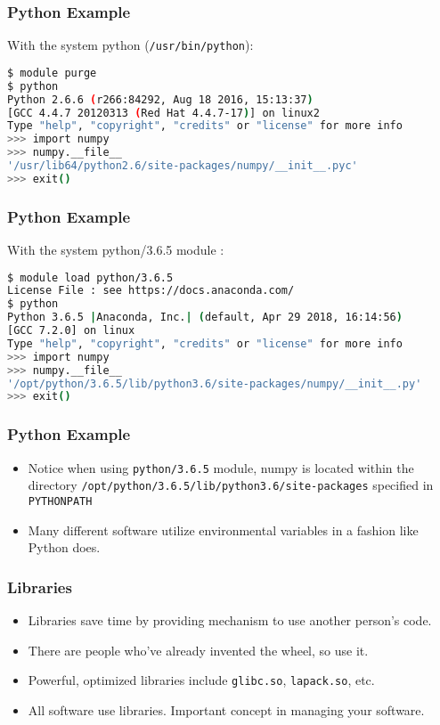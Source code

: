 \documentclass{beamer}
\newcommand{\code}[1]{\colorbox{codegray}{\texttt{#1}}}
\begin{document}
\begin{frame}[fragile]
\frametitle{Python Example}
With the system python (\code{/usr/bin/python}):
\begingroup
\scriptsize
\begin{lstlisting}[backgroundcolor = \color{codegray}, language = Bash, showstringspaces=false]
$ module purge
$ python
Python 2.6.6 (r266:84292, Aug 18 2016, 15:13:37)
[GCC 4.4.7 20120313 (Red Hat 4.4.7-17)] on linux2
Type "help", "copyright", "credits" or "license" for more info
>>> import numpy
>>> numpy.__file__
'/usr/lib64/python2.6/site-packages/numpy/__init__.pyc'
>>> exit()
\end{lstlisting}
\endgroup
\end{frame}


\begin{frame}[fragile]
\frametitle{Python Example}
With the system python/3.6.5 module :
\begingroup
\scriptsize
\begin{lstlisting}[backgroundcolor = \color{codegray}, language = Bash, showstringspaces=false]
$ module load python/3.6.5
License File : see https://docs.anaconda.com/
$ python
Python 3.6.5 |Anaconda, Inc.| (default, Apr 29 2018, 16:14:56)
[GCC 7.2.0] on linux
Type "help", "copyright", "credits" or "license" for more info
>>> import numpy
>>> numpy.__file__
'/opt/python/3.6.5/lib/python3.6/site-packages/numpy/__init__.py'
>>> exit()
\end{lstlisting}
\endgroup
\end{frame}


\begin{frame}
\frametitle{Python Example}
\begin{itemize}
    \item Notice when using \code{python/3.6.5} module, numpy is located within the directory \code{/opt/python/3.6.5/lib/python3.6/site-packages} specified in \code{PYTHONPATH} 
    \bigskip
    \pause
    \item Many different software utilize environmental variables in a fashion like Python does.
\end{itemize}
\end{frame}


\begin{frame}
\frametitle{Libraries}
\begin{itemize}
    \item Libraries save time by providing mechanism to use another person's code.
    \bigskip
    \pause
    \item There are people who've already invented the wheel, so use it.
    \bigskip
    \pause
    \item Powerful, optimized libraries include \code{glibc.so}, \code{lapack.so}, etc.
    \bigskip
    \pause
    \item All software use libraries. Important concept in managing your software.
\end{itemize}
\end{frame}
\end{document}
